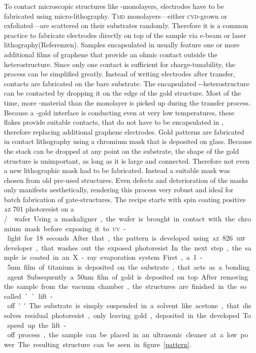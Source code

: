 To contact microscopic structures like \tmd-monolayers, electrodes have to be fabricated using micro-lithography. \textsc{Tmd} monolayers---either \textsc{cvd}-grown or exfoliated---are scattered on their substrates randomly. Therefore it is a common practice to fabricate electrodes directly on top of the sample via e-beam or laser lithography(Referenzen). Samples encapsulated in \hbng usually feature one or more additional films of graphene that provide an ohmic contact outside the heterostructure. Since only one contact is sufficient for charge-tunability, the process can be simplified greatly. Instead of writing electrodes after transfer, contacts are fabricated on the bare substrate. The encapsulated \hbn-\tmd-heterostructure can be contacted by dropping it on the edge of the gold structure. Most of the time, more \tmd-material than the monolayer is picked up during the transfer process. Because a \tmd-gold interface is conducting even at very low temperatures, these flakes provide suitable contacts, that do not have to be encapsulated in \hbn, therefore replacing additional graphene electrodes. Gold patterns are fabricated in contact lithography using a chromium mask that is deposited on glass. Because the stack can be dropped at any point on the substrate, the shape of the gold structure is unimportant, as long as it is large and connected. Therefore not even a new lithographic mask had to be fabricated. Instead a suitable mask was chosen from old pre-used structures. Even defects and deterioration of the masks only manifests aesthetically, rendering this process very robust and ideal for batch fabrication of gate-structures. The recipe starts with spin coating positive \textsc{az} 701 photoresist on a \si/\sio wafer. Using a maskaligner, the wafer is brought in contact with the chromium mask before exposing it to \textsc{uv}-light for 18 seconds. After that, the pattern is developed using \textsc{az} 826 \textsc{mif} developer, that washes out the exposed photoresist.

In the next step, the sample is coated in an X-ray evaporation system. First, a 1-5nm film of titanium is deposited on the substrate, that acts as a bonding agent. Subsequently a 50nm film of gold is deposited on top. After removing the sample from the vacuum chamber, the structures are finished in the so called ``lift-off''. The substrate is simply suspended in a solvent like acetone, that dissolves residual photoresist, only leaving gold, deposited in the developed. To speed up the lift-off process, the sample can be placed in an ultrasonic cleaner at a low power. The resulting structure can be seen in figure \ref{pattern}. 

